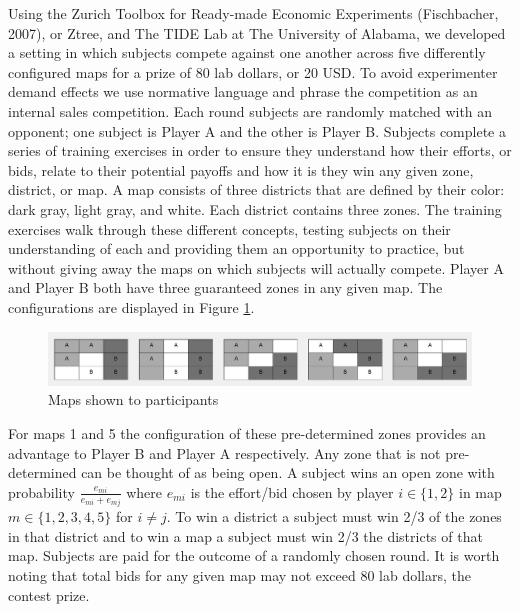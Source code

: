 \documentclass[AER]{AEA}
\begin{document}
Using the Zurich Toolbox for Ready-made Economic Experiments (Fischbacher, 2007), or Ztree, and The TIDE Lab at The University of Alabama, we developed a setting in which subjects compete against one another across five differently configured maps for a prize of 80 lab dollars, or 20 USD. To avoid experimenter demand effects we use normative language and phrase the competition as an internal sales competition. Each round subjects are randomly matched with an opponent; one subject is Player A and the other is Player B. Subjects complete a series of training exercises in order to ensure they understand how their efforts, or bids, relate to their potential payoffs and how it is they win any given zone, district, or map. A map consists of three districts that are defined by their color: dark gray, light gray, and white. Each district contains three zones. The training exercises walk through these different concepts, testing subjects on their understanding of each and providing them an opportunity to practice, but without giving away the maps on which subjects will actually compete. Player A and Player B both have three guaranteed zones in any given map. The configurations are displayed in Figure \ref{fig:maps}.
\begin{figure}[h]
\centering
\includegraphics[scale=0.5]{maps.png}
\caption{Maps shown to participants}
\label{fig:maps}
\end{figure}
For maps 1 and 5 the configuration of these pre-determined zones provides an advantage to Player B and Player A respectively. Any zone that is not pre-determined can be thought of as being open. A subject wins an open zone with probability $\frac{e_{mi}}{e_{mi}+e_{mj}}$ where $e_{mi}$ is the effort/bid chosen by player $i \in \{1,2\}$ in map $m\in \{1,2,3,4,5\}$ for $i \not= j$. To win a district a subject must win 2/3 of the zones in that district and to win a map a subject must win 2/3 the districts of that map. Subjects are paid for the outcome of a randomly chosen round. It is worth noting that total bids for any given map may not exceed 80 lab dollars, the contest prize. 
\end{document}
